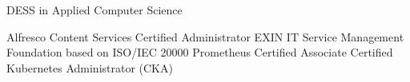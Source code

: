 %
%
%


\begin{scholarship}
					{DESS in Applied Computer Science}
\end{scholarship}

\begin{scholarship}
					{Alfresco Content Services Certified Administrator}
					{EXIN IT Service Management Foundation based on ISO/IEC 20000}
					{Prometheus Certified Associate}
					{Certified Kubernetes Administrator (CKA)}
\end{scholarship}
